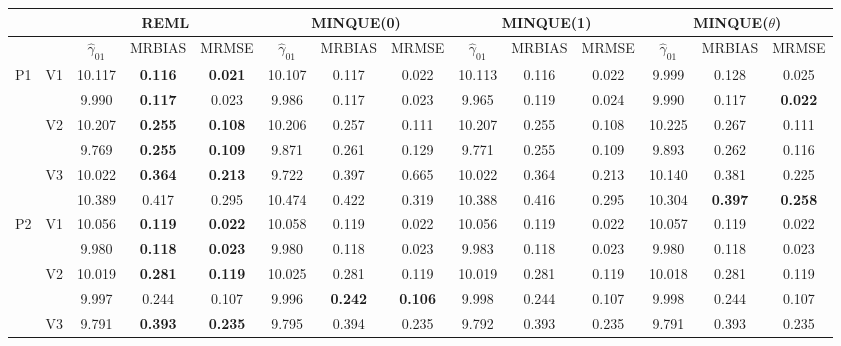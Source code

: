 \documentclass[12pt,a4paper]{article}
\begin{document}
\begin{sidewaystable}[ht]
\centering
{\footnotesize
\begin{tabular}{cc|ccc|ccc|ccc|ccc|}
   & & \multicolumn{3}{c|}{REML}&\multicolumn{3}{c|}{MINQUE(0)}&\multicolumn{3}{c|}{MINQUE(1)}&\multicolumn{3}{c|}{MINQUE($\theta$)}\\ \hline
 &  & $\hat{\gamma}_{01}$ & MRBIAS & MRMSE & $\hat{\gamma}_{01}$ & MRBIAS & MRMSE & $\hat{\gamma}_{01}$ & MRBIAS & MRMSE & $\hat{\gamma}_{01}$ & MRBIAS & MRMSE \\ 
  \hline
\multirow{6}{*}{P1} & \multirow{2}{*}{V1} & 10.117 & \textbf{0.116} & \textbf{0.021} & 10.107 & 0.117 & 0.022 & 10.113 & 0.116 & 0.022 & 9.999 & 0.128 & 0.025 \\ 
   &  & 9.990 & \textbf{0.117} & 0.023 & 9.986 & 0.117 & 0.023 & 9.965 & 0.119 & 0.024 & 9.990 & 0.117 & \textbf{0.022} \\ 
   & \multirow{2}{*}{V2} & 10.207 & \textbf{0.255} & \textbf{0.108} & 10.206 & 0.257 & 0.111 & 10.207 & 0.255 & 0.108 & 10.225 & 0.267 & 0.111 \\ 
   &  & 9.769 & \textbf{0.255} & \textbf{0.109} & 9.871 & 0.261 & 0.129 & 9.771 & 0.255 & 0.109 & 9.893 & 0.262 & 0.116 \\ 
   & \multirow{2}{*}{V3} & 10.022 & \textbf{0.364} & \textbf{0.213} & 9.722 & 0.397 & 0.665 & 10.022 & 0.364 & 0.213 & 10.140 & 0.381 & 0.225 \\ 
   &  & 10.389 & 0.417 & 0.295 & 10.474 & 0.422 & 0.319 & 10.388 & 0.416 & 0.295 & 10.304 & \textbf{0.397} & \textbf{0.258} \\ 
   \hline \hline\multirow{6}{*}{P2} & \multirow{2}{*}{V1} & 10.056 & \textbf{0.119} & \textbf{0.022} & 10.058 & 0.119 & 0.022 & 10.056 & 0.119 & 0.022 & 10.057 & 0.119 & 0.022 \\ 
   &  & 9.980 & \textbf{0.118} & \textbf{0.023} & 9.980 & 0.118 & 0.023 & 9.983 & 0.118 & 0.023 & 9.980 & 0.118 & 0.023 \\ 
   & \multirow{2}{*}{V2} & 10.019 & \textbf{0.281} & \textbf{0.119} & 10.025 & 0.281 & 0.119 & 10.019 & 0.281 & 0.119 & 10.018 & 0.281 & 0.119 \\ 
   &  & 9.997 & 0.244 & 0.107 & 9.996 & \textbf{0.242} & \textbf{0.106} & 9.998 & 0.244 & 0.107 & 9.998 & 0.244 & 0.107 \\ 
   & \multirow{2}{*}{V3} & 9.791 & \textbf{0.393} & \textbf{0.235} & 9.795 & 0.394 & 0.235 & 9.792 & 0.393 & 0.235 & 9.791 & 0.393 & 0.235 \\ 

\end{tabular}}
\end{sidewaystable}
\end{document}
